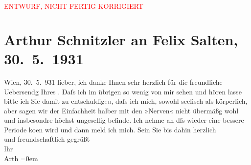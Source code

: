 
\begin{center}
            \textcolor{red}{ENTWURF, NICHT FERTIG KORRIGIERT}
                      \end{center}
            
         
         \renewcommand{\erwaehntePersonen}{Personen: Felix Salten}
         \renewcommand{\erwaehnteOrte}{Orte: Amerika, Wien}
         \renewcommand{\erwaehnteWerke}{Werke: Fünf Minuten Amerika}
               \section[Arthur Schnitzler an Felix Salten, 30. 5. 1931]{ Arthur Schnitzler an Felix Salten, 30. 5. 1931}\nopagebreak{}\rehead{ }\begin{ledgroupsized}[t]{13cm}\normalsize\beginnumbering \toendnotes[C]{\smallbreak\pagebreak[2]} 
\toendnotes[C]{\smallbreak}\pstart
           \raggedleft{}{\pb}Wien, 30. 5. 931\pend
           \pstart
           lieber, ich danke Ihnen sehr herzlich für die freundliche Uebersendg
               Ihres \label{K_L03026-1v}\label{K_L03026-1h}. Daſs ich im übrigen so wenig von mir sehen und hören lasse bitte ich Sie
               damit zu entschuldig\textcolor{gray}{en}, daſs ich mich, sowohl seelisch als
               körperlich, aber sagen wir der Einfachheit halber mit den »Nerven« nicht übermäßg
               wohl und insbesondre höchst ungesellig befinde. Ich nehme an dſs wieder {\pb}eine bessere Periode ko{\geminationm}en wird und dann meld ich mich. \pend
           \pstart
           Sein Sie bis dahin herzlich {\\[\baselineskip]}und freundschaftlich gegrüßt {\\[\baselineskip]}Ihr {\\[\baselineskip]}\spacefill\mbox{Arth}\pend
           \leftskip=0em{}
         
         \endnumbering{}\end{ledgroupsized}\begin{anhang}\end{anhang}\newcommand{\dateiname}{L03026}\newcommand{\titel}{Arthur Schnitzler an Felix Salten, 30. 5. 1931}\newcommand{\editorInnen}{Martin Anton Müller und Laura Untner}
      